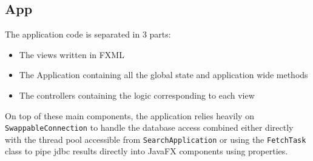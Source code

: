 \documentclass[a4paper]{article}
\begin{document}
\subsection{App}

The application code is separated in 3 parts:

\begin{itemize}
	\item The views written in FXML
	\item The Application containing all the global state and application wide methods
	\item The controllers containing the logic corresponding to each view
\end{itemize}

On top of these main components, the application relies heavily on \texttt{SwappableConnection} to handle the database access combined either directly with the thread pool accessible from \texttt{SearchApplication} or using the \texttt{FetchTask} class to pipe jdbc results directly into JavaFX components using properties.
\end{document}
